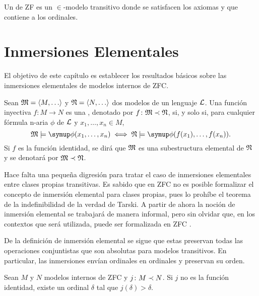 \begin{defi}
    Un  de ZF es un $\in$-modelo transitivo
    donde se satisfacen los axiomas y que contiene a los ordinales.
\end{defi}

\section{Inmersiones Elementales}
\label{sec:elem-embed}

El objetivo de este capítulo es establecer los resultados básicos
sobre las inmersiones elementales de modelos internos de ZFC.

\begin{defi}
    Sean $\model{M} = \op{M,\dots}$ y $\model{N} = \op{N,\dots}$ dos modelos de un lenguaje $\mathcal { L }$.
    Una función inyectiva $f\colon M\to N$ es una ,
    denotado por $f\colon \mathfrak { M }\prec\mathfrak { N }$, si, y solo si, para cualquier fórmula
    n-aria $\phi$ de $\mathcal { L }$ y $x_1,\dots,x_n \in M$,
    \[
        \model{M}\models\phi(x_1,\dots,x_n) \iff \model{N}\models\phi(f(x_1),\dots,f(x_n)).
    \]
    Si $f$ es la función identidad, se dirá que $\mathfrak { M }$
    es una subestructura elemental de $\mathfrak { N }$ y se denotará por $\mathfrak { M }\prec\mathfrak { N }$.
\end{defi}

Hace falta una pequeña digresión para tratar el caso de inmersiones elementales
entre clases propias transitivas. Es sabido que en ZFC no es posible formalizar
el concepto de inmersión elemental para clases propias, pues lo prohíbe el teorema
de la indefinibilidad de la verdad de Tarski.
A partir de ahora la noción de inmersión elemental se trabajará de manera informal,
pero sin olvidar que, en los contextos que será utilizada, puede ser formalizada
en ZFC \autocite[45-46]{kanamori_higher_2009}.

De la definición de inmersión elemental se sigue que estas preservan todas
las operaciones conjuntistas que son absolutas para modelos transitivos.
En particular, las inmersiones envían ordinales en ordinales y
preservan su orden.

\begin{teo}\label{teo:elem-embed-trivial}
    Sean $M$ y $N$ modelos internos de ZFC y $j\colon M\prec N$.
    Si $j$ no es la función identidad, existe un ordinal $\delta$
    tal que $j(\delta)>\delta$.
\end{teo}

